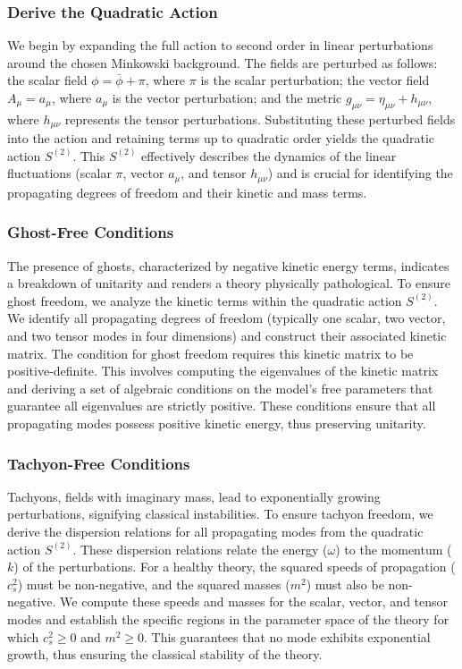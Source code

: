 \documentclass[twocolumn]{aastex631}
\begin{document}
\begin{itemize}
\subsubsection{Derive the Quadratic Action}
We begin by expanding the full action to second order in linear perturbations around the chosen Minkowski background. The fields are perturbed as follows: the scalar field $\phi = \bar{\phi} + \pi$, where $\pi$ is the scalar perturbation; the vector field $A_\mu = a_\mu$, where $a_\mu$ is the vector perturbation; and the metric $g_{\mu\nu} = \eta_{\mu\nu} + h_{\mu\nu}$, where $h_{\mu\nu}$ represents the tensor perturbations. Substituting these perturbed fields into the action and retaining terms up to quadratic order yields the quadratic action $S^{(2)}$. This $S^{(2)}$ effectively describes the dynamics of the linear fluctuations (scalar $\pi$, vector $a_\mu$, and tensor $h_{\mu\nu}$) and is crucial for identifying the propagating degrees of freedom and their kinetic and mass terms.

\subsubsection{Ghost-Free Conditions}
The presence of ghosts, characterized by negative kinetic energy terms, indicates a breakdown of unitarity and renders a theory physically pathological. To ensure ghost freedom, we analyze the kinetic terms within the quadratic action $S^{(2)}$. We identify all propagating degrees of freedom (typically one scalar, two vector, and two tensor modes in four dimensions) and construct their associated kinetic matrix. The condition for ghost freedom requires this kinetic matrix to be positive-definite. This involves computing the eigenvalues of the kinetic matrix and deriving a set of algebraic conditions on the model's free parameters that guarantee all eigenvalues are strictly positive. These conditions ensure that all propagating modes possess positive kinetic energy, thus preserving unitarity.

\subsubsection{Tachyon-Free Conditions}
Tachyons, fields with imaginary mass, lead to exponentially growing perturbations, signifying classical instabilities. To ensure tachyon freedom, we derive the dispersion relations for all propagating modes from the quadratic action $S^{(2)}$. These dispersion relations relate the energy ($\omega$) to the momentum ($k$) of the perturbations. For a healthy theory, the squared speeds of propagation ($c_s^2$) must be non-negative, and the squared masses ($m^2$) must also be non-negative. We compute these speeds and masses for the scalar, vector, and tensor modes and establish the specific regions in the parameter space of the theory for which $c_s^2 \ge 0$ and $m^2 \ge 0$. This guarantees that no mode exhibits exponential growth, thus ensuring the classical stability of the theory.


\end{itemize}
\end{document}
